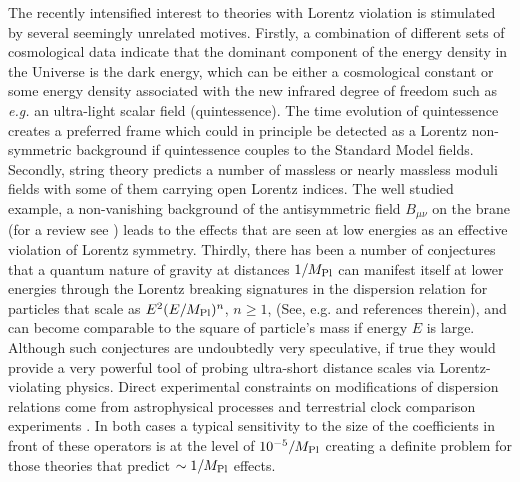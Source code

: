\documentclass[12pt]{revtex4}
\begin{document}
The recently intensified  interest to 
theories with Lorentz violation is stimulated by several seemingly 
unrelated motives. Firstly, a combination of different sets of 
cosmological data indicate that the dominant 
component of the energy density in the Universe is the dark energy, 
which can be either a cosmological constant or some energy density 
associated with the new infrared degree of freedom such as {\em e.g.} 
an ultra-light scalar field (quintessence). 
The time evolution of quintessence creates a preferred frame 
which could in principle be detected as a Lorentz non-symmetric background if 
quintessence couples to the Standard Model fields. 
Secondly, string theory predicts a number of massless or nearly massless 
moduli fields with some of them carrying open Lorentz indices. The well studied 
example, a non-vanishing background of the antisymmetric field $B_{\mu\nu}$
on the brane (for a review see \cite{DN})
leads to the effects that are seen at low energies as an effective 
violation of Lorentz symmetry. Thirdly, there has been a number of 
conjectures that a quantum nature of gravity at distances $1/M_{\rm Pl}$ 
can manifest itself at lower energies through the  Lorentz breaking signatures 
in the dispersion relation for particles 
that scale as $E^2(E/M_{\rm Pl})^n$, $n \geq 1$, (See, e.g. \cite{lcq} and references therein), 
and can become comparable to the square of particle's mass if energy $E$ is large. 
Although such conjectures are undoubtedly 
very speculative, if true they would provide a very powerful tool of probing 
ultra-short distance scales via Lorentz-violating physics.  Direct experimental constraints on 
modifications of dispersion relations come from astrophysical processes 
\cite{CFJ,AmC,Ted1,GK,Kost2,Sarkar} and terrestrial 
clock comparison experiments \cite{clock1,clock2,Vuc,MP:}. In both cases a
typical sensitivity to the size of the coefficients in 
front of these operators is at the level of $10^{-5}/M_{\rm Pl}$ creating 
a definite problem for those theories that predict $\sim 1/M_{\rm Pl}$ effects.
\end{document}
